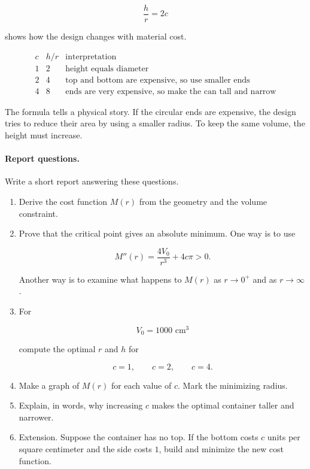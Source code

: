 \[
\frac{h}{r}=2c
\]

shows how the design changes with material cost.

\[
\begin{array}{c|c|c}
c & h/r & \text{interpretation} \\ \hline
1 & 2 & \text{height equals diameter} \\
2 & 4 & \text{top and bottom are expensive, so use smaller ends} \\
4 & 8 & \text{ends are very expensive, so make the can tall and narrow}
\end{array}
\]

The formula tells a physical story.  If the circular ends are expensive, the design tries
to reduce their area by using a smaller radius.  To keep the same volume, the height
must increase.

\paragraph{Report questions.}
Write a short report answering these questions.

\begin{enumerate}
\item Derive the cost function \(M(r)\) from the geometry and the volume constraint.

\item Prove that the critical point gives an absolute minimum.  One way is to use

\[
M''(r)=\frac{4V_0}{r^3}+4c\pi>0.
\]

Another way is to examine what happens to \(M(r)\) as \(r\to0^+\) and as
\(r\to\infty\).

\item For

\[
V_0=1000\text{ cm}^3
\]

compute the optimal \(r\) and \(h\) for

\[
c=1,\qquad c=2,\qquad c=4.
\]

\item Make a graph of \(M(r)\) for each value of \(c\).  Mark the minimizing radius.

\item Explain, in words, why increasing \(c\) makes the optimal container taller and
narrower.

\item Extension.  Suppose the container has no top.  If the bottom costs \(c\) units per
square centimeter and the side costs \(1\), build and minimize the new cost function.
\end{enumerate}

